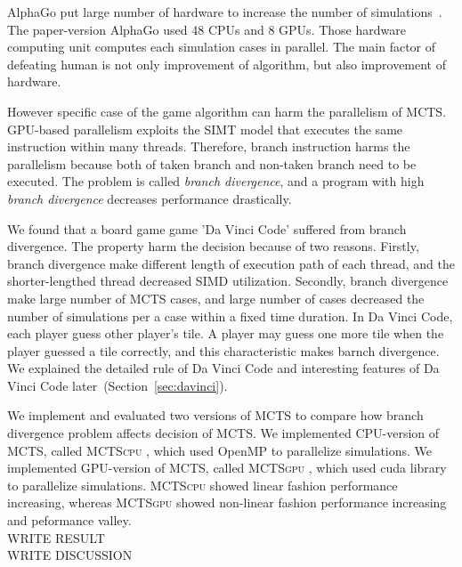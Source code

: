 \documentclass[conference]{IEEEtran}
\newcommand{\cpu} {\textsc{MCTScpu} }
\newcommand{\gpu} {\textsc{MCTSgpu} }
\begin{document}
AlphaGo put large number of hardware to increase the number of simulations~\cite{silver2016mastering_alphago}.
The paper-version AlphaGo used 48 CPUs and 8 GPUs.
Those hardware computing unit computes each simulation cases in parallel.
The main factor of defeating human is not only improvement of algorithm, but also improvement of hardware.

However specific case of the game algorithm can harm the parallelism of MCTS.
GPU-based parallelism exploits the SIMT model that executes the same instruction within many threads.
Therefore, branch instruction harms the parallelism because both of taken branch and non-taken branch need to be executed.
The problem is called \textit{branch divergence}, and a program with high \textit{branch divergence} decreases performance drastically.

We found that a board game game 'Da Vinci Code' suffered from branch divergence.
The property harm the decision because of two reasons.
Firstly, branch divergence make different length of execution path of each thread, and the shorter-lengthed thread decreased SIMD utilization.
Secondly, branch divergence make large number of MCTS cases, and large number of cases decreased the number of simulations per a case within a fixed time duration.
In Da Vinci Code, each player guess other player's tile.
A player may guess one more tile when the player guessed a tile correctly, and this characteristic makes barnch divergence.
We explained the detailed rule of Da Vinci Code and interesting features of Da Vinci Code later~(Section~\ref{sec:davinci}).


We implement and evaluated two versions of MCTS to compare how branch divergence problem affects decision of MCTS.
We implemented CPU-version of MCTS, called \cpu, which used OpenMP to parallelize simulations.
We implemented GPU-version of MCTS, called \gpu, which used cuda library to parallelize simulations.
\cpu showed linear fashion performance increasing, whereas \gpu showed non-linear fashion performance increasing and peformance valley.
\\WRITE RESULT
\\WRITE DISCUSSION
\end{document}
